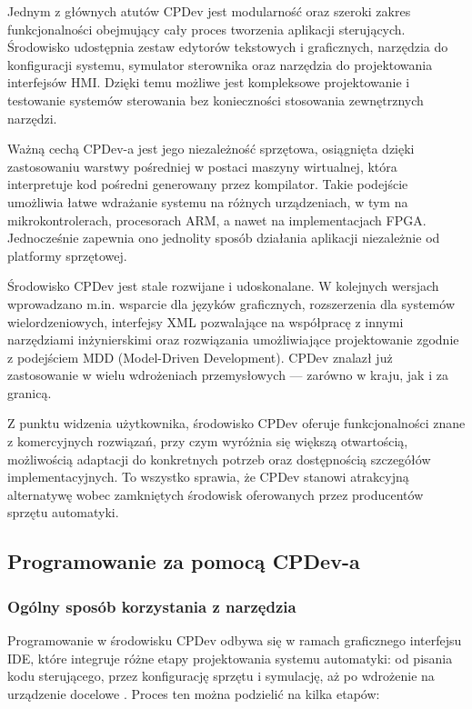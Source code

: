 \documentclass[12pt,twoside]{article}
\begin{document}
Jednym z głównych atutów CPDev jest modularność oraz szeroki zakres funkcjonalności obejmujący cały proces tworzenia aplikacji sterujących. Środowisko udostępnia zestaw edytorów tekstowych i graficznych, narzędzia do konfiguracji systemu, symulator sterownika oraz narzędzia do projektowania interfejsów HMI. Dzięki temu możliwe jest kompleksowe projektowanie i testowanie systemów sterowania bez konieczności stosowania zewnętrznych narzędzi.

Ważną cechą CPDev-a jest jego niezależność sprzętowa, osiągnięta dzięki zastosowaniu warstwy pośredniej w postaci maszyny wirtualnej, która interpretuje kod pośredni generowany przez kompilator. Takie podejście umożliwia łatwe wdrażanie systemu na różnych urządzeniach, w tym na mikrokontrolerach, procesorach ARM, a nawet na implementacjach FPGA\cite{cpdevFPGA}. Jednocześnie zapewnia ono jednolity sposób działania aplikacji niezależnie od platformy sprzętowej.

Środowisko CPDev jest stale rozwijane i udoskonalane. W kolejnych wersjach wprowadzano m.in. wsparcie dla języków graficznych, rozszerzenia dla systemów wielordzeniowych, interfejsy XML pozwalające na współpracę z innymi narzędziami inżynierskimi oraz rozwiązania umożliwiające projektowanie zgodnie z podejściem MDD (Model-Driven Development). CPDev znalazł już zastosowanie w wielu wdrożeniach przemysłowych — zarówno w kraju, jak i za granicą.

Z punktu widzenia użytkownika, środowisko CPDev oferuje funkcjonalności znane z komercyjnych rozwiązań, przy czym wyróżnia się większą otwartością, możliwością adaptacji do konkretnych potrzeb oraz dostępnością szczegółów implementacyjnych. To wszystko sprawia, że CPDev stanowi atrakcyjną alternatywę wobec zamkniętych środowisk oferowanych przez producentów sprzętu automatyki.
\subsection{Programowanie za pomocą CPDev-a}
\subsubsection{Ogólny sposób korzystania z narzędzia}
Programowanie w środowisku CPDev odbywa się w ramach graficznego interfejsu IDE, które integruje różne etapy projektowania systemu automatyki: od pisania kodu sterującego, przez konfigurację sprzętu i symulację, aż po wdrożenie na urządzenie docelowe \cite{cpdev2009}. Proces ten można podzielić na kilka etapów:
\end{document}
